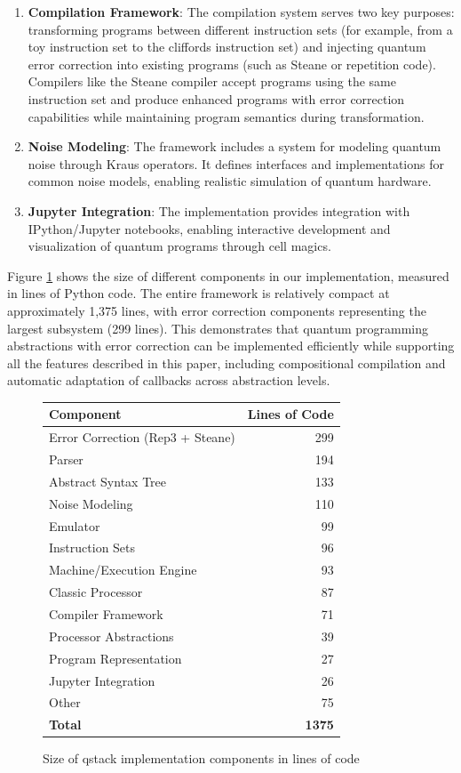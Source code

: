 \begin{enumerate}
\item \textbf{Compilation Framework}: The compilation system serves two key purposes: transforming programs between different instruction sets (for example, from a toy instruction set to the cliffords instruction set) and injecting quantum error correction into existing programs (such as Steane or repetition code). Compilers like the Steane compiler accept programs using the same instruction set and produce enhanced programs with error correction capabilities while maintaining program semantics during transformation.

\item \textbf{Noise Modeling}: The framework includes a system for modeling quantum noise through Kraus operators. It defines interfaces and implementations for common noise models, enabling realistic simulation of quantum hardware.

\item \textbf{Jupyter Integration}: The implementation provides integration with IPython/Jupyter notebooks, enabling interactive development and visualization of quantum programs through cell magics.
\end{enumerate}

Figure \ref{fig:codesize} shows the size of different components in our implementation, measured in lines of Python code. The entire framework is relatively compact at approximately 1,375 lines, with error correction components representing the largest subsystem (299 lines). This demonstrates that quantum programming abstractions with error correction can be implemented efficiently while supporting all the features described in this paper, including compositional compilation and automatic adaptation of callbacks across abstraction levels.

\begin{figure}[ht]
\centering
\scriptsize
\begin{tabular}{lr}
\hline
\textbf{Component} & \textbf{Lines of Code} \\
\hline
Error Correction (Rep3 + Steane) & 299 \\
Parser & 194 \\
Abstract Syntax Tree & 133 \\
Noise Modeling & 110 \\
Emulator & 99 \\
Instruction Sets & 96 \\
Machine/Execution Engine & 93 \\
Classic Processor & 87 \\
Compiler Framework & 71 \\
Processor Abstractions & 39 \\
Program Representation & 27 \\
Jupyter Integration & 26 \\
Other & 75 \\
\hline
\textbf{Total} & \textbf{1375} \\
\hline
\end{tabular}
\normalsize
\caption{Size of qstack implementation components in lines of code}
\label{fig:codesize}
\end{figure}

